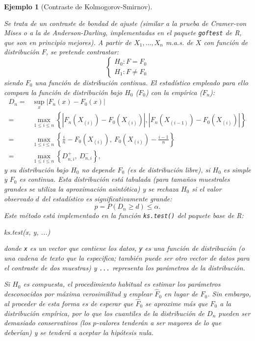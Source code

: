 \documentclass[
  10pt,
]{book}
\newenvironment{Shaded}{\begin{snugshade}}{\end{snugshade}}
\newcommand{\FunctionTok}[1]{\textcolor[rgb]{0.00,0.00,0.00}{#1}}
\newcommand{\NormalTok}[1]{#1}
\theoremstyle{break}
\newtheorem{example}{Ejemplo}[chapter]
\theoremstyle{nonumberplain}
\begin{document}
\begin{example}[Contraste de Kolmogorov-Smirnov]
\protect\hypertarget{exm:ks-test-sim-exp}{}\label{exm:ks-test-sim-exp}

Se trata de un contraste de bondad de ajuste (similar a la prueba de
Cramer-von Mises o a la de Anderson-Darling, implementadas en el paquete
\texttt{goftest} de R, que son en principio mejores).
A partir de \(X_1,\ldots ,X_n\) m.a.s. de \(X\) con función de distribución \(F\),
se pretende contrastar:
\[\left \{ 
\begin{array}{l}
H_0 : F = F_0 \\ 
H_1 : F \neq F_0 
\end{array}
\right. \]
siendo \(F_0\) una función de distribución continua.
El estadístico empleado para ello compara la función de distribución bajo
\(H_0\) (\(F_0\)) con la empírica (\(F_n\)):
\[\begin{aligned}
    D_n=&\sup_{x}|F_n(x)-F_0(x)| \\
    =&\max_{1 \leq i\leq n}\left \{
    |F_n(X_{(i)})-F_0(X_{(i)})|,|F_n(X_{(i-1)})-F_0(X_{(i)})|\right \} \\
    =&\max_{1 \leq i\leq n}\left \{ \frac{i}{n}-F_0(X_{(i)}), \ F_0(X_{(i)})-\frac{i-1}{n}\right \} \\
    =&\max_{1 \leq i\leq n}\left \{ D_{n,i}^{+},\ D_{n,i}^{-}\right \},
\end{aligned}\]
y su distribución bajo \(H_0\) no depende \(F_0\) (es de distribución libre),
si \(H_0\) es simple y \(F_0\) es continua.
Esta distribución está tabulada (para tamaños muestrales grandes se utiliza
la aproximación asintótica) y se rechaza \(H_0\) si el valor observado \(d\)
del estadístico es significativamente grande:
\[p = P \left( D_n \geq d \right) \leq \alpha.\]
Este método está implementado en la función \texttt{ks.test()} del paquete base de R:

\begin{Shaded}
\begin{Highlighting}[]
\FunctionTok{ks.test}\NormalTok{(x, y, ...)}
\end{Highlighting}
\end{Shaded}

donde \texttt{x} es un vector que contiene los datos, \texttt{y} es una función de distribución
(o una cadena de texto que la especifica; también puede ser otro vector de datos
para el contraste de dos muestras) y \texttt{...} representa los parámetros de la distribución.

Si \(H_0\) es compuesta, el procedimiento habitual es estimar los parámetros desconocidos
por máxima verosimilitud y emplear \(\hat{F}_0\) en lugar de \(F_0\).
Sin embargo, al proceder de esta forma es de esperar que \(\hat{F}_0\) se aproxime más
que \(F_0\) a la distribución empírica, por lo que los cuantiles de la distribución de
\(D_n\) pueden ser demasiado conservativos (los \(p\)-valores tenderán a ser mayores de
lo que deberían) y se tenderá a aceptar la hipótesis nula.


\end{example}
\end{document}
